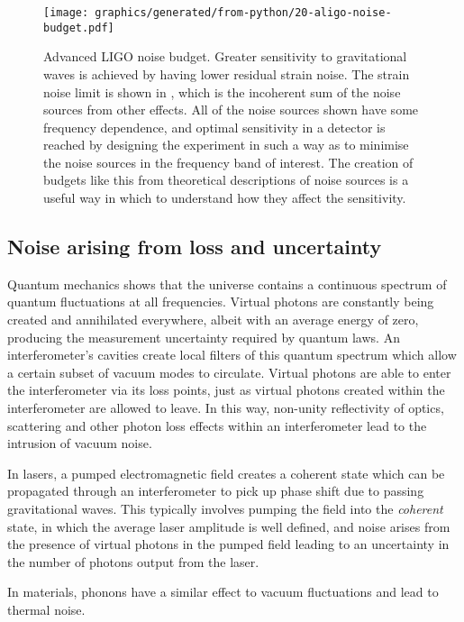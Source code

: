 \begin{figure}
  \centering
  \texttt{[image: graphics/generated/from-python/20-aligo-noise-budget.pdf]}
  \caption[Advanced LIGO noise budget]{\label{fig:aligo-noise-budget}Advanced LIGO noise budget. Greater sensitivity to gravitational waves is achieved by having lower residual strain noise. The strain noise limit is shown in , which is the incoherent sum of the noise sources from other effects. All of the noise sources shown have some frequency dependence, and optimal sensitivity in a detector is reached by designing the experiment in such a way as to minimise the noise sources in the frequency band of interest. The creation of budgets like this from theoretical descriptions of noise sources is a useful way in which to understand how they affect the sensitivity.}
\end{figure}

\subsection{\label{sec:noise-via-loss}Noise arising from loss and uncertainty}
Quantum mechanics shows that the universe contains a continuous spectrum of quantum fluctuations at all frequencies. Virtual photons are constantly being created and annihilated everywhere, albeit with an average energy of zero, producing the measurement uncertainty required by quantum laws. An interferometer's cavities create local filters of this quantum spectrum which allow a certain subset of vacuum modes to circulate. Virtual photons are able to enter the interferometer via its loss points, just as virtual photons created within the interferometer are allowed to leave. In this way, non-unity reflectivity of optics, scattering and other photon loss effects within an interferometer lead to the intrusion of vacuum noise.

In lasers, a pumped electromagnetic field creates a coherent state which can be propagated through an interferometer to pick up phase shift due to passing gravitational waves. This typically involves pumping the field into the \emph{coherent} state, in which the average laser amplitude is well defined, and noise arises from the presence of virtual photons in the pumped field leading to an uncertainty in the number of photons output from the laser.

In materials, phonons  have a similar effect to vacuum fluctuations and lead to thermal noise.

